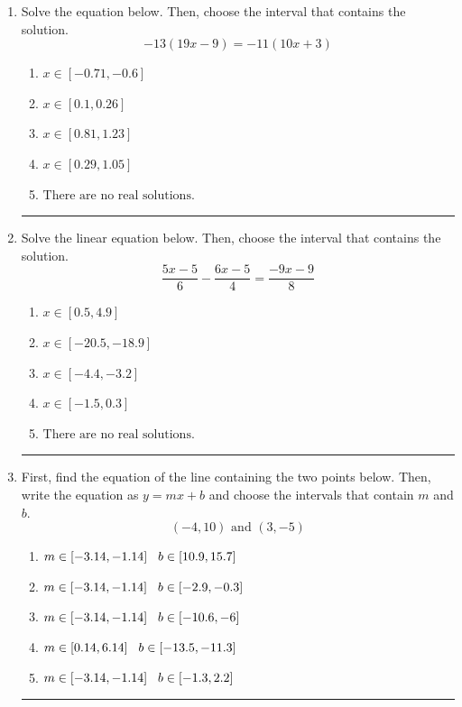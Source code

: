 \documentclass[14pt]{extbook}
\newcommand{\litem}[1]{\item#1\hspace*{-1cm}\rule{\textwidth}{0.4pt}}
\begin{document}
\begin{enumerate}
{\begin{enumerate}[label=\Alph*.]
\end{enumerate} }
\litem{
Solve the equation below. Then, choose the interval that contains the solution.\[ -13(19x -9) = -11(10x + 3) \]\begin{enumerate}[label=\Alph*.]
\item \( x \in [-0.71, -0.6] \)
\item \( x \in [0.1, 0.26] \)
\item \( x \in [0.81, 1.23] \)
\item \( x \in [0.29, 1.05] \)
\item \( \text{There are no real solutions.} \)

\end{enumerate} }
\litem{
Solve the linear equation below. Then, choose the interval that contains the solution.\[ \frac{5x -5}{6} - \frac{6x -5}{4} = \frac{-9x -9}{8} \]\begin{enumerate}[label=\Alph*.]
\item \( x \in [0.5, 4.9] \)
\item \( x \in [-20.5, -18.9] \)
\item \( x \in [-4.4, -3.2] \)
\item \( x \in [-1.5, 0.3] \)
\item \( \text{There are no real solutions.} \)

\end{enumerate} }
\litem{
First, find the equation of the line containing the two points below. Then, write the equation as $ y=mx+b $ and choose the intervals that contain $m$ and $b$.\[ (-4, 10) \text{ and } (3, -5) \]\begin{enumerate}[label=\Alph*.]
\item \( m \in [-3.14, -1.14] \hspace*{3mm} b \in [10.9, 15.7] \)
\item \( m \in [-3.14, -1.14] \hspace*{3mm} b \in [-2.9, -0.3] \)
\item \( m \in [-3.14, -1.14] \hspace*{3mm} b \in [-10.6, -6] \)
\item \( m \in [0.14, 6.14] \hspace*{3mm} b \in [-13.5, -11.3] \)
\item \( m \in [-3.14, -1.14] \hspace*{3mm} b \in [-1.3, 2.2] \)


\end{enumerate}}
\end{enumerate}
\end{document}
